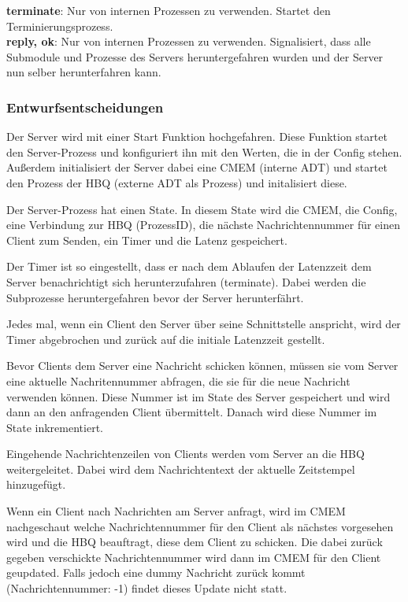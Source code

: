\documentclass{article}
\begin{document}
\textbf{terminate}: Nur von internen Prozessen zu verwenden. Startet den Terminierungsprozess.\\

\textbf{{reply, ok}}: Nur von internen Prozessen zu verwenden. Signalisiert, dass alle Submodule und Prozesse des Servers
heruntergefahren wurden und der Server nun selber herunterfahren kann.\\

\subsubsection{Entwurfsentscheidungen}
Der Server wird mit einer Start Funktion hochgefahren. Diese Funktion startet den Server-Prozess und konfiguriert ihn
mit den Werten, die in der Config stehen. Außerdem initialisiert der Server dabei eine CMEM (interne ADT) und startet
den Prozess der HBQ (externe ADT als Prozess) und initalisiert diese.

Der Server-Prozess hat einen State. In diesem State wird die CMEM, die Config, eine Verbindung zur HBQ (ProzessID),
die nächste Nachrichtennummer für einen Client zum Senden, ein Timer und die Latenz gespeichert.

Der Timer ist so eingestellt, dass er nach dem Ablaufen der Latenzzeit dem Server benachrichtigt sich herunterzufahren
(terminate). Dabei werden die Subprozesse heruntergefahren bevor der Server herunterfährt.

Jedes mal, wenn ein Client den Server über seine Schnittstelle anspricht, wird der Timer abgebrochen und zurück auf die
initiale Latenzzeit gestellt.

Bevor Clients dem Server eine Nachricht schicken können, müssen sie vom Server eine aktuelle Nachritennummer abfragen,
die sie für die neue Nachricht verwenden können. Diese Nummer ist im State des Server gespeichert und wird dann an den
anfragenden Client übermittelt. Danach wird diese Nummer im State inkrementiert.

Eingehende Nachrichtenzeilen von Clients werden vom Server an die HBQ weitergeleitet. Dabei wird dem Nachrichtentext der
aktuelle Zeitstempel hinzugefügt.

Wenn ein Client nach Nachrichten am Server anfragt, wird im CMEM nachgeschaut welche Nachrichtennummer für den Client
als nächstes vorgesehen wird und die HBQ beauftragt, diese dem Client zu schicken. Die dabei zurück gegeben verschickte
Nachrichtennummer wird dann im CMEM für den Client geupdated. Falls jedoch eine dummy Nachricht zurück kommt
(Nachrichtennummer: -1) findet dieses Update nicht statt.
			
\end{document}
